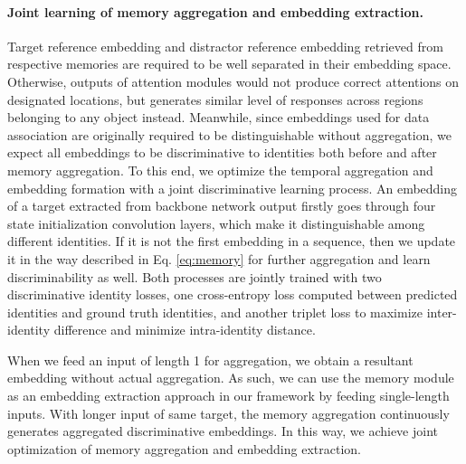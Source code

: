 \documentclass[final]{cvpr}
\begin{document}
\paragraph{Joint learning of memory aggregation and embedding extraction.}
Target reference embedding and distractor reference embedding retrieved from respective memories are required to be well separated in their embedding space. Otherwise, outputs of attention modules would not produce correct attentions on designated locations, but generates similar level of responses across regions belonging to any object instead. Meanwhile, since embeddings used for data association are originally required to be distinguishable without aggregation, we expect all embeddings to be discriminative to identities both before and after memory aggregation.
To this end, we optimize the temporal aggregation and embedding formation with a joint discriminative learning process. An embedding of a target extracted from backbone network output firstly goes through four state initialization convolution layers, which make it distinguishable among different identities. If it is not the first embedding in a sequence, then we update it in the way described in Eq. \ref{eq:memory} for further aggregation and learn discriminability as well. Both processes are jointly trained with two discriminative identity losses, one cross-entropy loss computed between predicted identities and ground truth identities, and another triplet loss to maximize inter-identity difference and minimize intra-identity distance.

When we feed an input of length 1 for aggregation, we obtain a resultant embedding without actual aggregation. As such, we can use the memory module as an embedding extraction approach in our framework by feeding single-length inputs. With longer input of same target, the memory aggregation continuously generates aggregated discriminative embeddings. In this way, we achieve joint optimization of memory aggregation and embedding extraction.

\end{document}
